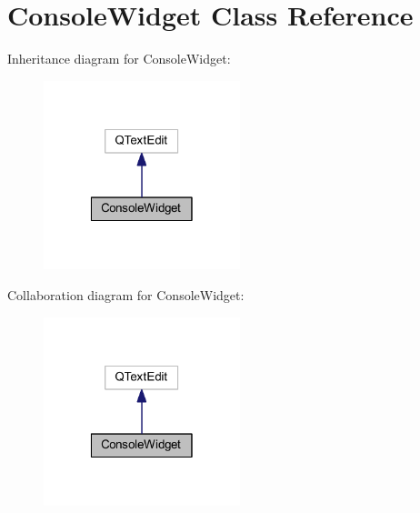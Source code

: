 \hypertarget{class_console_widget}{\section{Console\-Widget Class Reference}
\label{class_console_widget}
}


Inheritance diagram for Console\-Widget\-:\nopagebreak
\begin{figure}[H]
\begin{center}
\leavevmode
\includegraphics[width=162pt]{class_console_widget__inherit__graph}
\end{center}
\end{figure}


Collaboration diagram for Console\-Widget\-:\nopagebreak
\begin{figure}[H]
\begin{center}
\leavevmode
\includegraphics[width=162pt]{class_console_widget__coll__graph}
\end{center}
\end{figure}
